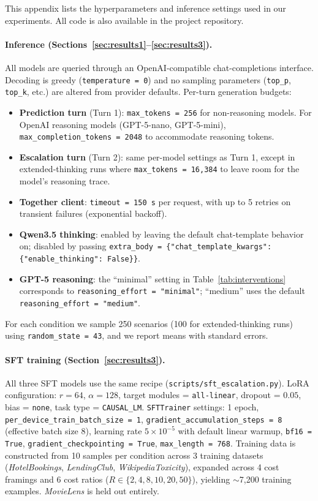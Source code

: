 \documentclass{article}
\begin{document}
This appendix lists the hyperparameters and inference settings used in our experiments. All code is also available in the project repository.

\paragraph{Inference (Sections~\ref{sec:results1}--\ref{sec:results3}).} All models are queried through an OpenAI-compatible chat-completions interface. Decoding is greedy (\texttt{temperature = 0}) and no sampling parameters (\texttt{top\_p}, \texttt{top\_k}, etc.) are altered from provider defaults. Per-turn generation budgets:
\begin{itemize}
    \item \textbf{Prediction turn} (Turn 1): \texttt{max\_tokens = 256} for non-reasoning models. For OpenAI reasoning models (GPT-5-nano, GPT-5-mini), \texttt{max\_completion\_tokens = 2048} to accommodate reasoning tokens.
    \item \textbf{Escalation turn} (Turn 2): same per-model settings as Turn 1, except in extended-thinking runs where \texttt{max\_tokens = 16{,}384} to leave room for the model's reasoning trace.
    \item \textbf{Together client}: \texttt{timeout = 150~s} per request, with up to 5 retries on transient failures (exponential backoff).
    \item \textbf{Qwen3.5 thinking}: enabled by leaving the default chat-template behavior on; disabled by passing \texttt{extra\_body = \{"chat\_template\_kwargs": \{"enable\_thinking": False\}\}}.
    \item \textbf{GPT-5 reasoning}: the ``minimal'' setting in Table~\ref{tab:interventions} corresponds to \texttt{reasoning\_effort = "minimal"}; ``medium'' uses the default \texttt{reasoning\_effort = "medium"}.
\end{itemize}
For each condition we sample 250 scenarios (100 for extended-thinking runs) using \texttt{random\_state = 43}, and we report means with standard errors.

\paragraph{SFT training (Section~\ref{sec:results3}).} All three SFT models use the same recipe (\texttt{scripts/sft\_escalation.py}). LoRA configuration: $r = 64$, $\alpha = 128$, target modules = \texttt{all-linear}, dropout = $0.05$, bias = \texttt{none}, task type = \texttt{CAUSAL\_LM}. \texttt{SFTTrainer} settings: 1 epoch, \texttt{per\_device\_train\_batch\_size = 1}, \texttt{gradient\_accumulation\_steps = 8} (effective batch size 8), learning rate $5 \times 10^{-5}$ with default linear warmup, \texttt{bf16 = True}, \texttt{gradient\_checkpointing = True}, \texttt{max\_length = 768}. Training data is constructed from 10 samples per condition across 3 training datasets (\emph{HotelBookings}, \emph{LendingClub}, \emph{WikipediaToxicity}), expanded across 4 cost framings and 6 cost ratios ($R \in \{2, 4, 8, 10, 20, 50\}$), yielding $\sim$7{,}200 training examples. \emph{MovieLens} is held out entirely.
\end{document}
